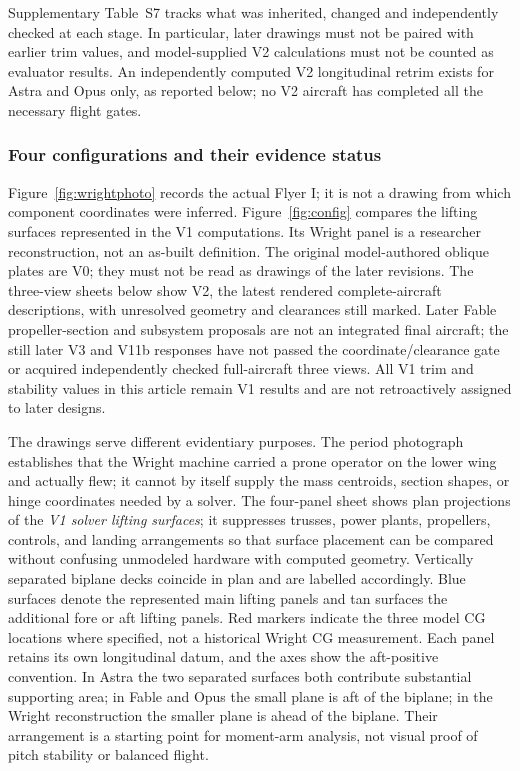 \documentclass[10pt,letterpaper]{article}
\begin{document}
Supplementary Table~S7 tracks what was inherited, changed and independently checked at each stage. In particular, later drawings must not be paired with earlier trim values, and model-supplied V2 calculations must not be counted as evaluator results. An independently computed V2 longitudinal retrim exists for Astra and Opus only, as reported below; no V2 aircraft has completed all the necessary flight gates.



\subsubsection{Four configurations and their evidence status}
Figure~\ref{fig:wrightphoto} records the actual Flyer I; it is not a drawing from which component coordinates were inferred. Figure~\ref{fig:config} compares the lifting surfaces represented in the V1 computations. Its Wright panel is a researcher reconstruction, not an as-built definition. The original model-authored oblique plates are V0; they must not be read as drawings of the later revisions. The three-view sheets below show V2, the latest rendered complete-aircraft descriptions, with unresolved geometry and clearances still marked. Later Fable propeller-section and subsystem proposals are not an integrated final aircraft; the still later V3 and V11b responses have not passed the coordinate/clearance gate or acquired independently checked full-aircraft three views. All V1 trim and stability values in this article remain V1 results and are not retroactively assigned to later designs.

The drawings serve different evidentiary purposes. The period photograph establishes that the Wright machine carried a prone operator on the lower wing and actually flew; it cannot by itself supply the mass centroids, section shapes, or hinge coordinates needed by a solver. The four-panel sheet shows plan projections of the \emph{V1 solver lifting surfaces}; it suppresses trusses, power plants, propellers, controls, and landing arrangements so that surface placement can be compared without confusing unmodeled hardware with computed geometry. Vertically separated biplane decks coincide in plan and are labelled accordingly. Blue surfaces denote the represented main lifting panels and tan surfaces the additional fore or aft lifting panels. Red markers indicate the three model CG locations where specified, not a historical Wright CG measurement. Each panel retains its own longitudinal datum, and the axes show the aft-positive convention. In Astra the two separated surfaces both contribute substantial supporting area; in Fable and Opus the small plane is aft of the biplane; in the Wright reconstruction the smaller plane is ahead of the biplane. Their arrangement is a starting point for moment-arm analysis, not visual proof of pitch stability or balanced flight.
\end{document}
